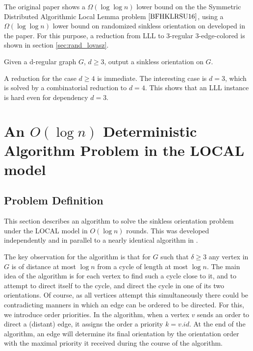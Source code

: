 The original paper \cite{BFHKLRSU16} shows a $\Omega(\log\log{n})$ lower bound on the the Symmetric Distributed Algorithmic Local Lemma problem $\cite{BFHKLRSU16}$, using a $\Omega(\log\log{n})$ lower bound  on randomized sinkless orientation on developed in the paper. For this purpose, a reduction from LLL to 3-regular 3-edge-colored is shown in section \ref{sec:rand_lovasz}.

\begin{problem}
	Given a d-regular graph $G$, $d \geq 3$, output a sinkless orientation on $G$.
\end{problem}

A reduction for the case $d \geq 4$ is immediate. The interesting case is $d=3$, which is solved by a combinatorial reduction to $d=4$. This shows that an LLL instance is hard even for dependency $d=3$. 





\section{An $O(\log{n})$ Deterministic Algorithm Problem in the LOCAL model} \label{AlgSection}
\subsection{Problem Definition}
This section describes an algorithm to solve the sinkless orientation problem under the LOCAL model in $O(\log{n})$ rounds. This was developed independently and in parallel to a nearly identical algorithm in \cite{GS2017}. 

The key observation for the algorithm is that for $G$ such that $\delta \geq 3$ any vertex in $G$ is of distance at most $\log{n}$ from a cycle of length at most $\log{n}$.  The main idea of the algorithm is for each vertex to find such a cycle close to it, and to attempt to direct itself to the cycle, and direct the cycle in one of its two orientations. Of course, as all vertices attempt this simultaneously there could be contradicting manners in which an edge can be ordered to be directed. For this, we introduce order priorities. In the algorithm, when a vertex $v$ sends an order to direct a (distant) edge, it assigns the order a priority $k=v.id$. At the end of the algorithm, an edge will determine its final orientation by the orientation order with the maximal priority it received during the course of the algorithm.


